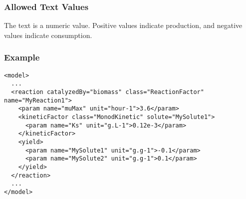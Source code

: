 \subsubsection{Allowed Text Values}

The text is a numeric value.  Positive values indicate production, and negative values indicate consumption.

\subsubsection{Example}

\begin{verbatim}
<model>
  ...  
  <reaction catalyzedBy="biomass" class="ReactionFactor" name="MyReaction1">
    <param name="muMax" unit="hour-1">3.6</param>
    <kineticFactor class="MonodKinetic" solute="MySolute1">
      <param name="Ks" unit="g.L-1">0.12e-3</param>
    </kineticFactor>
    <yield>
      <param name="MySolute1" unit="g.g-1">-0.1</param>
      <param name="MySolute2" unit="g.g-1">0.1</param>
    </yield>
  </reaction>
  ...  
</model>
\end{verbatim}
